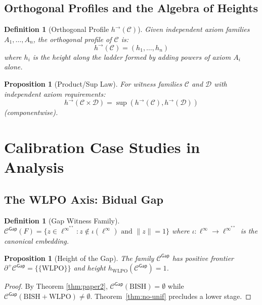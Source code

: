 \documentclass[11pt]{article}
\newtheorem{definition}[theorem]{Definition}
\newtheorem{proposition}[theorem]{Proposition}
\newcommand{\WLPO}{\mathrm{WLPO}}
\newcommand{\BISH}{\mathrm{BISH}}
\newcommand{\linf}{\ell^\infty}
\newcommand{\Frontierpos}{\partial^{+}}
\begin{document}
\subsection{Orthogonal Profiles and the Algebra of Heights}

\begin{definition}[Orthogonal Profile \(h^{\to}(\mathcal C)\)]
Given independent axiom families $A_1, \ldots, A_n$, the \emph{orthogonal profile} of $\mathcal{C}$ is:
\[
h^{\to}(\mathcal{C}) = (h_1, \ldots, h_n)
\]
where $h_i$ is the height along the ladder formed by adding powers of axiom $A_i$ alone.
\end{definition}

\begin{proposition}[Product/Sup Law]\label{prop:product-sup}
For witness families $\mathcal{C}$ and $\mathcal{D}$ with independent axiom requirements:
\[
h^{\to}(\mathcal{C} \times \mathcal{D}) = \sup(h^{\to}(\mathcal{C}), h^{\to}(\mathcal{D}))
\]
(componentwise).
\end{proposition}

\section{Calibration Case Studies in Analysis}

\subsection{The WLPO Axis: Bidual Gap}

\begin{definition}[Gap Witness Family]
$\mathcal{C}^{\mathsf{Gap}}(F) = \{z \in \linf^{**} : z \notin \iota(\linf) \text{ and } \|z\| = 1\}$ where $\iota: \linf \to \linf^{**}$ is the canonical embedding.
\end{definition}

\begin{proposition}[Height of the Gap]\label{prop:gap-height}
The family $\mathcal{C}^{\mathsf{Gap}}$ has positive frontier $\Frontierpos\mathcal{C}^{\mathsf{Gap}}=\{\{\WLPO\}\}$ and height $h_{\text{WLPO}}(\mathcal{C}^{\mathsf{Gap}})=1$.
\end{proposition}
\begin{proof}
By Theorem \ref{thm:paper2}, $\mathcal{C}^{\mathsf{Gap}}(\BISH) = \emptyset$ while $\mathcal{C}^{\mathsf{Gap}}(\BISH+\WLPO)\neq\emptyset$. Theorem~\ref{thm:no-unif} precludes a lower stage.
\end{proof}
\end{document}

